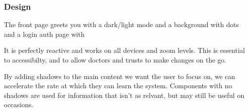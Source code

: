 \subsubsection{Design}
The front page greets you with a dark/light mode and a background with dots and a login auth page with

It is perfectly reactive and works on all devices and zoom levels. This is essential to accessibilty, and to allow doctors and trusts to make changes on the go.

By adding shadows to the main content we want the user to focus on, we can accelerate the rate at which they can learn the system. Components with no shadows are used for information that isn't as relvant, but may still be useful on occasions.